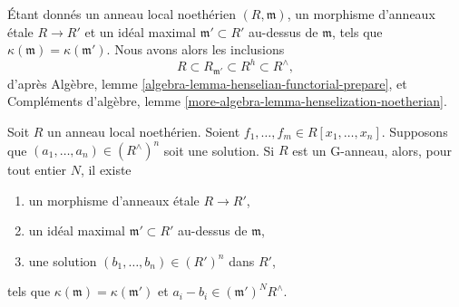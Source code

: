 \noindent
Étant donnés un anneau local noethérien $(R, \mathfrak m)$, un morphisme
d'anneaux \'etale $R \to R'$ et un idéal maximal
$\mathfrak m' \subset R'$ au-dessus de $\mathfrak m$, tels que
$\kappa(\mathfrak m) = \kappa(\mathfrak m')$. Nous avons alors les inclusions
$$
R \subset R_{\mathfrak m'} \subset R^h \subset R^\wedge,
$$
d'après Algèbre, lemme \ref{algebra-lemma-henselian-functorial-prepare}, et
Compléments d'algèbre, lemme
\ref{more-algebra-lemma-henselization-noetherian}.

\begin{theorem}
\label{theorem-approximation-property-variant}
Soit $R$ un anneau local noethérien. Soient
$f_1, \ldots, f_m \in R[x_1, \ldots, x_n]$.
Supposons que $(a_1, \ldots, a_n) \in (R^\wedge)^n$ soit une solution.
Si $R$ est un G-anneau, alors, pour tout entier $N$, il existe
\begin{enumerate}
\item un morphisme d'anneaux \'etale $R \to R'$,
\item un idéal maximal $\mathfrak m' \subset R'$ au-dessus de $\mathfrak m$,
\item une solution $(b_1, \ldots, b_n) \in (R')^n$ dans $R'$,
\end{enumerate}
tels que $\kappa(\mathfrak m) = \kappa(\mathfrak m')$ et
$a_i - b_i \in (\mathfrak m')^NR^\wedge$.
\end{theorem}

